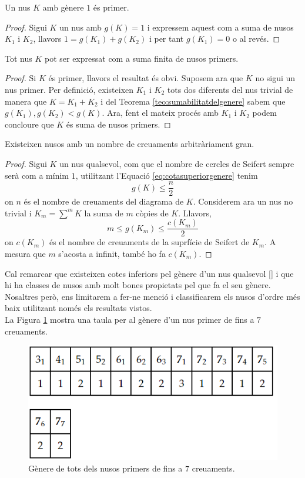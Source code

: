 \begin{corolary}
	Un nus $K$ amb gènere $1$ és primer.
\end{corolary}

\begin{proof}
	Sigui $K$ un nus amb $g(K)=1$ i expressem aquest com a suma de nusos $K_1$ i $K_2$, llavors $1=g(K_1)+g(K_2)$ i per tant $g(K_1)=0$ o al revés.
\end{proof}

\begin{corolary}
	Tot nus $K$ pot ser expressat com a suma finita de nusos primers.
\end{corolary}

\begin{proof}
	Si $K$ és primer, llavors el resultat és obvi. Suposem ara que $K$ no sigui un nus primer. Per definició, existeixen $K_1$ i $K_2$ tots dos diferents del nus trivial de manera que $K=K_1+K_2$ i del Teorema \ref{teo:sumabilitatdelgenere} sabem que $g(K_1),g(K_2)<g(K)$. Ara, fent el mateix procés amb $K_1$ i $K_2$ podem concloure que $K$ és suma de nusos primers.
\end{proof}

\begin{corolary}
	Existeixen nusos amb un nombre de creuaments arbitràriament gran.
\end{corolary}

\begin{proof}
	Sigui $K$ un nus qualsevol, com que el nombre de cercles de Seifert sempre serà com a mínim $1$, utilitzant l'Equació \ref{eq:cotasuperiorgenere} tenim $$g(K)\leq \frac{n}{2}$$ on $n$ és el nombre de creuaments del diagrama de $K$. Considerem ara un nus no trivial i $K_m=\sum^{m}K$ la suma de $m$ còpies de $K$. Llavors, $$m\leq g(K_m)\leq \frac{c(K_m)}{2}$$ on $c(K_m)$ és el nombre de creuaments de la suprfície de Seifert de $K_m$. A mesura que $m$ s'acosta a infinit, també ho fa $c(K_m)$.
\end{proof}

Cal remarcar que existeixen cotes inferiors pel gènere d'un nus qualsevol [\cite{lowerbound}] i que hi ha classes de nusos amb molt bones propietats pel que fa el seu gènere. Nosaltres però, ens limitarem a fer-ne menció i classificarem els nusos d'ordre més baix utilitzant només els resultats vistos.\\

La Figura \ref{fig:genus} mostra una taula per al gènere d'un nus primer de fins a $7$ creuaments.

\begin{figure}
	\centering
	\includegraphics[width=\linewidth]{img/genus.png}
	\caption{Gènere de tots dels nusos primers de fins a $7$ creuaments.}\label{fig:genus}
\end{figure}